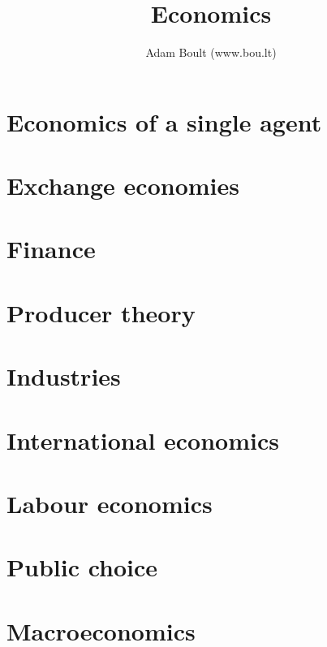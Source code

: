 \documentclass[oneside]{book}
\begin{document}
\author{Adam Boult (www.bou.lt)}
\title{Economics}
\maketitle

\setcounter{tocdepth}{1}
\tableofcontents



\part{Economics of a single agent}


\part{Exchange economies}





\part{Finance}





\part{Producer theory}









\part{Industries}



\part{International economics}


\part{Labour economics}




\part{Public choice}









\part{Macroeconomics}




\end{document}
